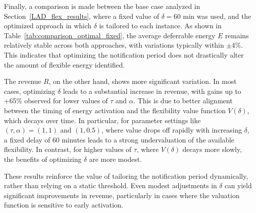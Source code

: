 \documentclass[preprint,12pt]{elsarticle}
\begin{document}
Finally, a comparison is made between the base case analyzed in Section~\ref{LAD_flex_results}, where a fixed value of $\delta = 60$ min was used, and the optimized approach in which $\delta$ is tailored to each instance. As shown in Table~\ref{tab:comparison_optimal_fixed}, the average deferrable energy $E$ remains relatively stable across both approaches, with variations typically within $\pm 4\%$. This indicates that optimizing the notification period does not drastically alter the amount of flexible energy identified.

The revenue $R$, on the other hand, shows more significant variation. In most cases, optimizing $\delta$ leads to a substantial increase in revenue, with gains up to +65\% observed for lower values of $\tau$ and $\alpha$. This is due to better alignment between the timing of energy activation and the flexibility value function $V(\delta)$, which decays over time. In particular, for parameter settings like $(\tau, \alpha) = (1, 1)$ and $(1, 0.5)$, where value drops off rapidly with increasing $\delta$, a fixed delay of 60 minutes leads to a strong undervaluation of the available flexibility. In contrast, for higher values of $\tau$, where $V(\delta)$ decays more slowly, the benefits of optimizing $\delta$ are more modest.

These results reinforce the value of tailoring the notification period dynamically, rather than relying on a static threshold. Even modest adjustments in $\delta$ can yield significant improvements in revenue, particularly in cases where the valuation function is sensitive to early activation.
\end{document}
